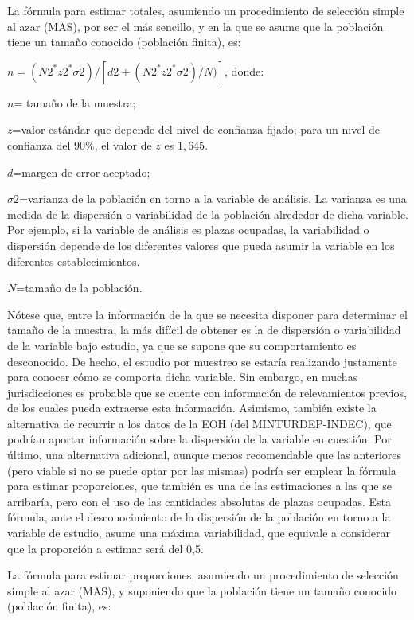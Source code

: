 \documentclass[
]{book}
\begin{document}
La fórmula para estimar totales, asumiendo un procedimiento de selección simple al azar (MAS), por ser el más sencillo, y en la que se asume que la población tiene un tamaño conocido (población finita), es:

\(n= (N2^*z2^*σ2)/ [d2+(N2^*z2^* σ2)/N) ]\), donde:

\(n\)= tamaño de la muestra;

\(z\)=valor estándar que depende del nivel de confianza fijado; para un nivel de confianza del \(90\%\), el valor de \(z\) es \(1,645\).

\(d\)=margen de error aceptado;

\(σ2\)=varianza de la población en torno a la variable de análisis. La varianza es una medida de la dispersión o variabilidad de la población alrededor de dicha variable. Por ejemplo, si la variable de análisis es plazas ocupadas, la variabilidad o dispersión depende de los diferentes valores que pueda asumir la variable en los diferentes establecimientos.

\(N\)=tamaño de la población.

Nótese que, entre la información de la que se necesita disponer para determinar el tamaño de la muestra, la más difícil de obtener es la de dispersión o variabilidad de la variable bajo estudio, ya que se supone que su comportamiento es desconocido. De hecho, el estudio por muestreo se estaría realizando justamente para conocer cómo se comporta dicha variable. Sin embargo, en muchas jurisdicciones es probable que se cuente con información de relevamientos previos, de los cuales pueda extraerse esta información. Asimismo, también existe la alternativa de recurrir a los datos de la EOH (del MINTURDEP-INDEC), que podrían aportar información sobre la dispersión de la variable en cuestión. Por último, una alternativa adicional, aunque menos recomendable que las anteriores (pero viable si no se puede optar por las mismas) podría ser emplear la fórmula para estimar proporciones, que también es una de las estimaciones a las que se arribaría, pero con el uso de las cantidades absolutas de plazas ocupadas. Esta fórmula, ante el desconocimiento de la dispersión de la población en torno a la variable de estudio, asume una máxima variabilidad, que equivale a considerar que la proporción a estimar será del 0,5.

La fórmula para estimar proporciones, asumiendo un procedimiento de selección simple al azar (MAS), y suponiendo que la población tiene un tamaño conocido (población finita), es:
\end{document}
